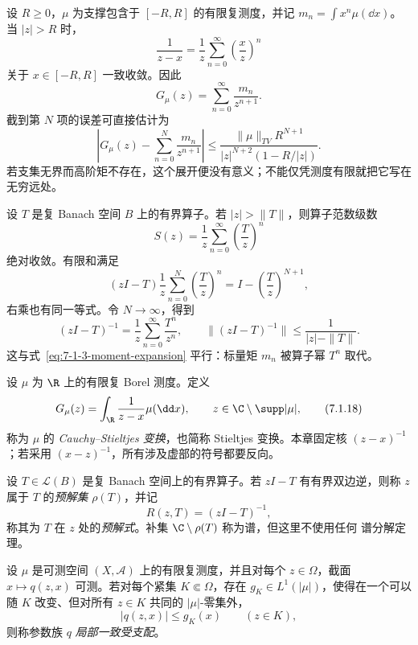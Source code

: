 \begin{example}[无穷远矩展开]\label{ex:7-1-3-2}
设 $R\ge0$，$\mu$ 为支撑包含于 $[-R,R]$ 的有限复测度，并记
$m_n=\int x^n\mu(\dd x)$。当 $|z|>R$ 时，
\[
 \frac1{z-x}=\frac1z\sum_{n=0}^{\infty}\left(\frac{x}{z}\right)^n
\]
关于 $x\in[-R,R]$ 一致收敛。因此
\[
 G_\mu(z)=\sum_{n=0}^{\infty}\frac{m_n}{z^{n+1}}.
 \tag{7.1.15}\label{eq:7-1-3-moment-expansion}
\]
截到第 $N$ 项的误差可直接估计为
\[
 \left|G_\mu(z)-\sum_{n=0}^{N}\frac{m_n}{z^{n+1}}\right|
 \le \frac{\|\mu\|_{TV}R^{N+1}}
 {|z|^{N+2}(1-R/|z|)}.
 \tag{7.1.16}\label{eq:7-1-3-moment-remainder}
\]
若支集无界而高阶矩不存在，这个展开便没有意义；不能仅凭测度有限就把它写在无穷远处。
\end{example}

\begin{example}\label{ex:7-1-3-3}
设 $T$ 是复 Banach 空间 $B$ 上的有界算子。若 $|z|>\|T\|$，则算子范数级数
\[
 S(z)=\frac1z\sum_{n=0}^{\infty}\left(\frac{T}{z}\right)^n
\]
绝对收敛。有限和满足
\[
 (zI-T)\frac1z\sum_{n=0}^{N}\left(\frac{T}{z}\right)^n
 =I-\left(\frac{T}{z}\right)^{N+1},
\]
右乘也有同一等式。令 $N\to\infty$，得到
\[
 (zI-T)^{-1}=\frac1z\sum_{n=0}^{\infty}\frac{T^n}{z^n},
 \qquad
 \|(zI-T)^{-1}\|\le\frac1{|z|-\|T\|}.
 \tag{7.1.17}\label{eq:7-1-3-neumann-resolvent}
\]
这与式~\eqref{eq:7-1-3-moment-expansion} 平行：标量矩 $m_n$ 被算子幂 $T^n$ 取代。
\end{example}

\begin{definition}\label{def:7-1-3-1}
设 $\mu$ 为 $\R$ 上的有限复 Borel 测度。定义
\[
 G_\mu(z)=\int_\R\frac1{z-x}\mu(\dd x),
 \qquad z\in\C\setminus\supp|\mu|,
 \tag{7.1.18}\label{eq:7-1-3-stieltjes-definition}
\]
称为 $\mu$ 的 \emph{Cauchy--Stieltjes 变换}，也简称 Stieltjes 变换。本章固定核
$(z-x)^{-1}$；若采用 $(x-z)^{-1}$，所有涉及虚部的符号都要反向。
\end{definition}

\begin{definition}[预解集与预解式]\label{def:7-1-3-2}
设 $T\in\mathcal L(B)$ 是复 Banach 空间上的有界算子。若 $zI-T$ 有有界双边逆，则称
$z$ 属于 $T$ 的\emph{预解集} $\rho(T)$，并记
\[
  R(z,T)=(zI-T)^{-1},
\]
称其为 $T$ 在 $z$ 处的\emph{预解式}。补集 $\C\setminus\rho(T)$ 称为谱，但这里不使用任何
谱分解定理。
\end{definition}

\begin{definition}[局部一致支配]\label{def:7-1-3-3}
设 $\mu$ 是可测空间 $(X,\mathcal A)$ 上的有限复测度，并且对每个 $z\in\Omega$，截面
$x\mapsto q(z,x)$ 可测。若对每个紧集 $K\Subset\Omega$，存在
$g_K\in L^1(|\mu|)$，使得在一个可以随 $K$ 改变、但对所有 $z\in K$ 共同的 $|\mu|$-零集外，
\[
  |q(z,x)|\le g_K(x)\qquad(z\in K),
\]
则称参数族 $q$ \emph{局部一致受支配}。
\end{definition}

